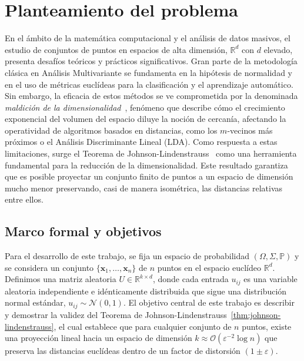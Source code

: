 \chapter{Planteamiento del problema}

En el ámbito de la matemática computacional y el análisis de datos
masivos, el estudio de conjuntos de puntos en espacios de alta
dimensión, $\mathbb{R}^d$ con $d$ elevado, presenta desafíos teóricos
y prácticos significativos.
Gran parte de la metodología clásica en Análisis Multivariante se
fundamenta en la hipótesis de normalidad y en el uso de métricas
euclídeas para la clasificación y el aprendizaje automático.
Sin embargo, la eficacia de estos métodos se ve comprometida por la
denominada \emph{maldición de la dimensionalidad}~\cite{Bellman1958},
fenómeno que describe cómo el crecimiento exponencial del volumen del
espacio diluye la noción de cercanía, afectando la operatividad de
algoritmos basados en distancias, como los $m$-vecinos más próximos o
el Análisis Discriminante Lineal (LDA).
Como respuesta a estas limitaciones, surge el Teorema de
Johnson-Lindenstrauss~\cite{Johnson1984} como una herramienta
fundamental para la reducción de la dimensionalidad.
Este resultado garantiza que es posible proyectar un conjunto finito
de puntos a un espacio de dimensión mucho menor preservando, casi de
manera isométrica, las distancias relativas entre ellos.

\section{Marco formal y objetivos}

Para el desarrollo de este trabajo, se fija un espacio de
probabilidad $\left(\Omega,\Sigma,\mathbb{P}\right)$ y se considera
un conjunto $\{\symbf{x}_{1},\dotsc,\symbf{x}_{n}\}$ de $n$ puntos en
el espacio euclídeo $\mathbb{R}^{d}$.
Definimos una matriz aleatoria $U\in\mathbb{R}^{k\times d}$, donde
cada entrada $u_{ij}$ es una variable aleatoria independiente e
idénticamente distribuida que sigue una distribución normal estándar,
$u_{ij}\sim\mathcal{N}\left(0,1\right)$.
El objetivo central de este trabajo es describir y demostrar la
validez del Teorema de
Johnson-Lindenstrauss~\ref{thm:johnson-lindenstrauss}, el cual
establece que para cualquier conjunto de $n$ puntos, existe una
proyección lineal hacia un espacio de dimensión
$k\approx\mathcal{O}\left(\varepsilon^{-2}\log n\right)$ que preserva
las distancias euclídeas dentro de un factor de distorsión
$\left(1\pm\varepsilon\right)$.

